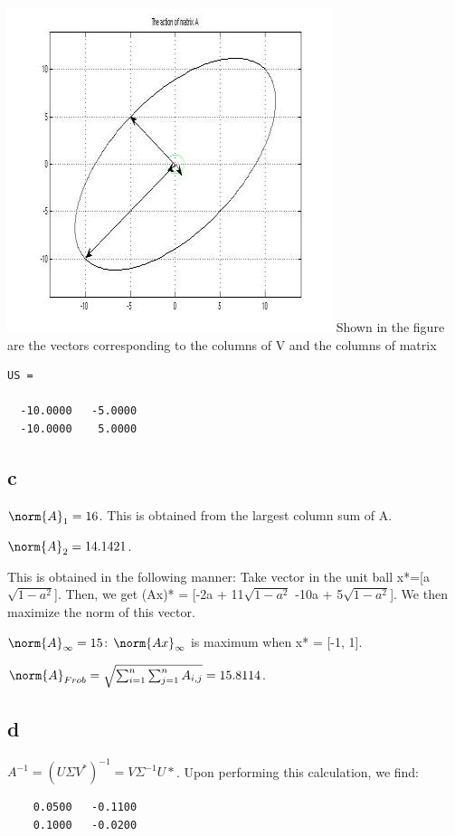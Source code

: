 \documentclass[10pt]{amsart}
\theoremstyle{remark}
\begin{document}
\includegraphics{ellipse.jpg}
Shown in the figure are the vectors corresponding to the columns of V and the columns of matrix

\begin{verbatim}
US =

  -10.0000   -5.0000
  -10.0000    5.0000
\end{verbatim}

\subsection{c}
$\norm{A}_{1} = 16$.
This is obtained from the largest column sum of A.

$\norm{A}_{2} = 14.1421$.

This is obtained in the following manner:
Take vector in the unit ball x*=[a $\sqrt{1-a^{2}}$]. Then, we get (Ax)* = [-2a + 11$\sqrt{1-a^{2}}$ -10a + 5$\sqrt{1-a^{2}}$]. We then maximize the norm of this vector.

$\norm{A}_{\infty} = 15$: $\norm{Ax}_{\infty}$ is maximum when x* = [-1, 1].

$\norm{A}_{Frob} = \sqrt{\sum_{i=1}^{n}\sum_{j=1}^{n} A_{i,j}} = 15.8114$.

\subsection{d}
$A^{-1} = (U\Sigma V^{*})^{-1} = V\Sigma^{-1}U*$.
Upon performing this calculation, we find:
\begin{verbatim}
    0.0500   -0.1100
    0.1000   -0.0200
\end{verbatim}
\end{document}
